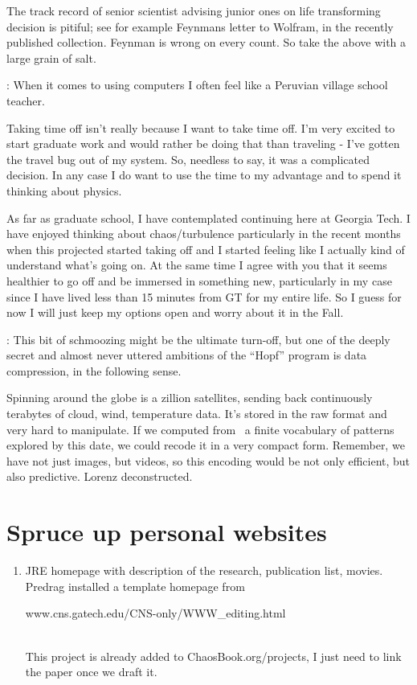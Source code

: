 The track record of senior scientist advising junior ones on life transforming decision
is pitiful; see for example Feynmans letter to Wolfram,
in the recently published collection. Feynman is wrong on every count.
So take the above with a large grain of salt.

\medskip{}:
When it comes to using computers I often feel like a Peruvian
village school teacher.

Taking time off isn't really because I want to take time off. I'm
very excited to start graduate work and would rather be doing that
than traveling - I've gotten the travel bug out of my system. So,
needless to say, it was a complicated decision. In any case I do
want to use the time to my advantage and to spend it thinking about
physics.

As far as graduate school, I have contemplated continuing here at
Georgia Tech. I have enjoyed thinking about chaos/turbulence
particularly in the recent months when this projected started taking
off and I started feeling like I actually kind of understand what's
going on. At the same time I agree with you that it seems healthier
to go off and be immersed in something new, particularly in my case
since I have lived less than 15 minutes from GT for my entire life.
So I guess for now I will just keep my options open and worry about
it in the Fall.

\medskip{}: This bit of schmoozing might
be the ultimate turn-off, but one of the deeply secret and almost
never uttered ambitions of the ``Hopf'' program is data compression,
in the following sense.

Spinning around the globe is a zillion satellites, sending back continuously
terabytes of cloud, wind, temperature data. It's stored in the raw format
and very hard to manipulate. If we computed from \NSe\ a finite
vocabulary of patterns explored by this date, we could recode it in a very
compact form. Remember, we have not just images, but videos, so this
encoding would be not only efficient, but also predictive. Lorenz
deconstructed.



\section{Spruce up personal websites}

\begin{enumerate}
\item
{}
     {JRE homepage} with description of the research, publication list,  movies.
Predrag installed a template homepage
from
\\
\centerline{
     {www.cns.gatech.edu/CNS-only/WWW\_editing.html}
           }\\
This project is already added to
     {ChaosBook.org/projects}, I just need to link the
paper once we draft it.

\end{enumerate}


